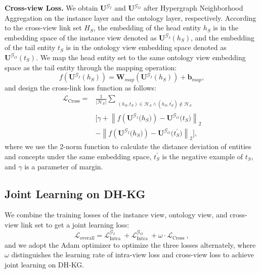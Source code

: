 \documentclass[letterpaper]{article} \usepackage{aaai23}  \usepackage{times}  \usepackage{helvet}  \usepackage{courier}  \usepackage[hyphens]{url}  \usepackage{graphicx} \urlstyle{rm} \def\UrlFont{\rm}  \usepackage{natbib}  \usepackage{caption} \frenchspacing  \setlength{\pdfpagewidth}{8.5in}  \setlength{\pdfpageheight}{11in}  \usepackage{times}
\begin{document}
\textbf{Cross-view Loss. } We obtain $\mathbf{U}^{\mathcal{G}_{I}}$ and $\mathbf{U}^{\mathcal{G}_{O}}$ after Hypergraph Neighborhood Aggregation on the instance layer and the ontology layer, respectively. According to the cross-view link set $H_S$, the embedding of the head entity $h_{S}$ is in the embedding space of the instance view denoted as $\mathbf{U}^{\mathcal{G}_{I}}({h_{S}})$, and the embedding of the tail entity $t_S$  is in the ontology view embedding space denoted as $\mathbf{U}^{\mathcal{G}_{O}}({t_{S}})$. We map the head entity set to the same ontology view embedding space as the tail entity through the mapping operation:
\begin{equation}
f(\mathbf{U}^{\mathcal{G}_{I}}({h_{S}}))=\mathbf{W}_{map}(\mathbf{U}^{\mathcal{G}_{I}}({h_{S}}))+\mathbf{b}_{map}, 
\end{equation}
and design the cross-link loss function as follows:
\begin{equation}
\begin{split}
\mathcal{L}_{\text{Cross}}=&\frac{1}{\left|\mathcal{H}_{\mathcal{S}}\right|}\sum_{\substack{\left(h_{S}, t_{S}\right) \in \mathcal{H}_{\mathcal{S}}\wedge\left(h_{S}, t_{S}^{\prime}\right) \notin \mathcal{H}_{\mathcal{S}}}}\\
&[\gamma+\left\|f\left(\mathbf{U}^{\mathcal{G}_{I}}({h_{S})}\right)-\mathbf{U}^{\mathcal{G}_{O}}({t_{S})}\right\|_{2}\\
&-\left\|f\left(\mathbf{U}^{\mathcal{G}_{I}}({h_{S})}\right)-\mathbf{U}^{\mathcal{G}_{O}}({t_{S}^{\prime})}\right\|_{2} ],
\end{split}
\end{equation}
where we use the 2-norm function to calculate the distance deviation of entities and concepts under the same embedding space, $t_{S}^{\prime}$ is the negative example of $t_{S}$, and $\gamma$ is a parameter of margin.


\subsection{Joint Learning on DH-KG}

We combine the training losses of the instance view, ontology view, and cross-view link set to get a joint learning loss:
\begin{equation}
\mathcal{L}_{\text {overall}}=\mathcal{L}_{\text {Intra }}^{\mathcal{G}_{I}}+\mathcal{L}_{\text {Intra }}^{\mathcal{G}_{O}}+\omega \cdot \mathcal{L}_{\text {Cross }},
\end{equation}
and we adopt the Adam optimizer to optimize the three losses alternately, where $\omega$ distinguishes the learning rate of intra-view loss and cross-view loss to achieve joint learning on DH-KG.
\end{document}
